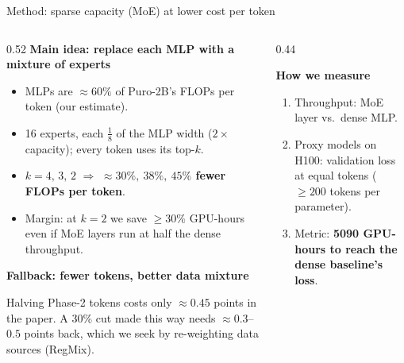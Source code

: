 \documentclass[aspectratio=169,10pt]{beamer}
\newcommand{\hl}[1]{\textcolor{accent}{\textbf{#1}}}
\newcommand{\head}[1]{\textbf{#1}\par\smallskip}
\begin{document}
\begin{frame}[t]{Method: sparse capacity (MoE) at lower cost per token}
\begin{columns}[T,onlytextwidth]
\begin{column}{0.52\textwidth}
\head{Main idea: replace each MLP with a mixture of experts}
\begin{itemize}\setlength{\itemsep}{2pt}
\item MLPs are $\approx 60\%$ of Puro-2B's FLOPs per token
      {\small\color{muted}(our estimate)}.
\item 16 experts, each $\tfrac18$ of the MLP width ($2\times$ capacity);
      every token uses its top-$k$.
\item $k = 4,\,3,\,2$ $\Rightarrow$ \hl{$\approx 30\%,\ 38\%,\ 45\%$ fewer
      FLOPs per token}.
\item Margin: at $k=2$ we save $\ge 30\%$ GPU-hours even if MoE layers
      run at half the dense throughput.
\end{itemize}

\smallskip
\head{Fallback: fewer tokens, better data mixture}
{\small Halving Phase-2 tokens costs only $\approx 0.45$ points in the
paper. A 30\% cut made this way needs $\approx 0.3$--$0.5$ points back,
which we seek by re-weighting data sources (RegMix).}
\end{column}
\begin{column}{0.44\textwidth}
\centering
{}

\smallskip
\raggedright
\head{How we measure}
{\small
\begin{enumerate}\setlength{\itemsep}{1pt}
\item Throughput: MoE layer vs.\ dense MLP.
\item Proxy models on H100: validation loss at equal tokens
      ($\ge 200$ tokens per parameter).
\item Metric: \hl{5090 GPU-hours to reach the dense baseline's loss}.
\end{enumerate}}
\end{column}
\end{columns}
\end{frame}
\end{document}
